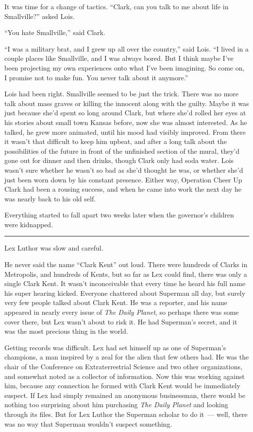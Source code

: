 \documentclass[ebook,12pt]{memoir}
\begin{document}
It was time for a change of tactics. ``Clark, can you talk to me about
life in Smallville?'' asked Lois.

``You hate Smallville,'' said Clark.

``I was a military brat, and I grew up all over the country,'' said
Lois. ``I lived in a couple places like Smallville, and I was always
bored. But I think maybe I've been projecting my own experiences onto
what I've been imagining. So come on, I promise not to make fun. You
never talk about it anymore.''

Lois had been right. Smallville seemed to be just the trick. There was
no more talk about mass graves or killing the innocent along with the
guilty. Maybe it was just because she'd spent so long around Clark, but
where she'd rolled her eyes at his stories about small town Kansas
before, now she was almost interested. As he talked, he grew more
animated, until his mood had visibly improved. From there it wasn't that
difficult to keep him upbeat, and after a long talk about the
possibilities of the future in front of the unfinished section of the
mural, they'd gone out for dinner and then drinks, though Clark only had
soda water. Lois wasn't sure whether he wasn't so bad as she'd thought
he was, or whether she'd just been worn down by his constant presence.
Either way, Operation Cheer Up Clark had been a rousing success, and
when he came into work the next day he was nearly back to his old self.

Everything started to fall apart two weeks later when the governor's
children were kidnapped.

\begin{center}\rule{0.5\linewidth}{\linethickness}\end{center}

Lex Luthor was slow and careful.

He never said the name ``Clark Kent'' out loud. There were hundreds of
Clarks in Metropolis, and hundreds of Kents, but so far as Lex could
find, there was only a single Clark Kent. It wasn't inconceivable that
every time he heard his full name his super hearing kicked. Everyone
chattered about Superman all day, but surely very few people talked
about Clark Kent. He was a reporter, and his name appeared in nearly
every issue of \emph{The Daily Planet}, so perhaps there was some cover
there, but Lex wasn't about to risk it. He had Superman's secret, and it
was the most precious thing in the world.

Getting records was difficult. Lex had set himself up as one of
Superman's champions, a man inspired by a zeal for the alien that few
others had. He was the chair of the Conference on Extraterrestrial
Science and two other organizations, and somewhat noted as a collector
of information. Now this was working against him, because any connection
he formed with Clark Kent would be immediately suspect. If Lex had
simply remained an anonymous businessman, there would be nothing too
surprising about him purchasing \emph{The Daily Planet} and looking
through its files. But for Lex Luthor the Superman scholar to do it~---
well, there was no way that Superman wouldn't suspect something.
\end{document}

